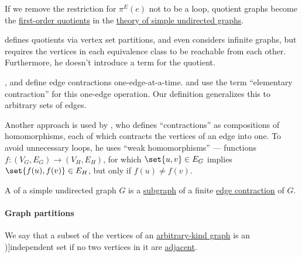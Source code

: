 \begin{comments}
  \item If we remove the restriction for \( \pi^E(e) \) not to be a loop, quotient graphs become the \hyperref[def:first_order_quotient]{first-order quotients} in the \hyperref[rem:theory_of_simple_undirected_graphs]{theory of simple undirected graphs}.

  \item {} defines quotients via vertex set partitions, and even considers infinite graphs, but requires the vertices in each equivalence class to be reachable from each other. Furthermore, he doesn't introduce a term for the quotient.

  \item {},  and  define edge contractions one-edge-at-a-time.  and  use the term \enquote{elementary contraction} for this one-edge operation. Our definition generalizes this to arbitrary sets of edges.

  \item Another approach is used by , who defines \enquote{contractions} as compositions of homomorphisms, each of which contracts the vertices of an edge into one. To avoid unnecessary loops, he uses \enquote{weak homomorphisms} --- functions \( f: (V_G, E_G) \to (V_H, E_H) \), for which \( \set{ u, v } \in E_G \) implies \( \set{ f(u), f(v) } \in E_H \), but only if \( f(u) \neq f(v) \).
\end{comments}

\begin{definition}\label{def:graph_minor}
  A  of a simple undirected graph \( G \) is a \hyperref[def:undirected_graph/subgraph]{subgraph} of a finite \hyperref[def:quotient_graph/edge]{edge contraction} of \( G \).
\end{definition}

\paragraph{Graph partitions}

\begin{definition}\label{def:graph_independent_set}
  We say that a subset of the vertices of an \hyperref[rem:arbitrary_kind_graph]{arbitrary-kind graph} is an \term[bg=независимо множество (\cite[103]{Мирчев2001})]{independent set} if no two vertices in it are \hyperref[def:graph_adjacency]{adjacent}.
\end{definition}

